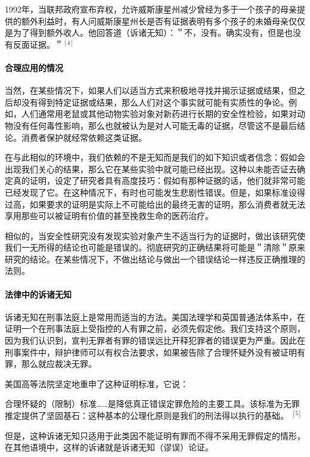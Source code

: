 1992年，当联邦政府宣布弃权，允许威斯康星州减少曾经为多于一个孩子的母亲提供的额外利益时，有人问威斯康星州长是否有证据表明有多个孩子的未婚母亲仅仅是为了得到额外收人。他回答道（诉诸无知）：＂不，没有。确实没有，但是也没有反面证据。＂${ }^{[4]}$

\paragraph{合理应用的情况}
当然，在某些情况下，如果人们以适当方式来积极地寻找并揭示证据或结果，但之后却没有得到特定证据或结果，那么人们对这个事实就可能有实质性的争论。例如，人们通常用老鼠或其他动物实验对象对新药进行长期的安全性检验，如果对动物没有任何毒性影响，那么也就被认为是对人可能无毒的证据，尽管这不是最后结论。消费者保护就经常依赖这类证据。

在与此相似的环境中，我们依赖的不是无知而是我们的如下知识或者信念：假如会出现我们关心的结果，那么它在某些实验中就可能已经出现。这种以未能否证去确定真的证明，设定了研究者具有高度技巧：假如有那种证据的话，他们就非常可能已经发现了它。在这种情况下，有时也可能发生悲剧性错误。但是，如果标准设得过高，如果要求的证明是实际上不可能给出的最终无害的证明，那么消费者就无法享用那些可以被证明有价值的甚至挽救生命的医药治疗。

相似的，当安全性研究没有发现实验对象产生不适当行为的证据时，做出该研究使我们一无所得的结论也可能是错误的。彻底研究的正确结果将可能是＂清除＂原来研究的结论。在某些情况下，不做出结论与做出一个错误结论一样违反正确推理的法则。

\paragraph{法律中的诉诸无知}
\begin{examplebox}[title=法律中的合理应用]
诉诸无知在刑事法庭上是常用而适当的方法。美国法理学和英国普通法体系中，在证明一个在刑事法庭上受指控的人有罪之前，必须先假定他。我们支持这个原则，因为我们认识到，宣判无罪者有罪的错误远比开释犯罪者的错误更为严重。因此在刑事案件中，辩护律师可以有权合法要求，如果被告除了合理怀疑外没有被证明有罪，那么就应裁决无罪。
\end{examplebox}

美国高等法院坚定地重申了这种证明标准，它说：

合理怀疑的（限制）标准……是降低真正错误定罪危险的主要工具。该标准为无罪推定提供了坚固基石：这种基本的公理化原则是我们的刑法得以执行的基础。 ${ }^{[5]}$

但是，这种诉诸无知只适用于此类因不能证明有罪而不得不采用无罪假定的情形，在其他语境中，这样的诉诸就是诉诸无知（谬误）论证。